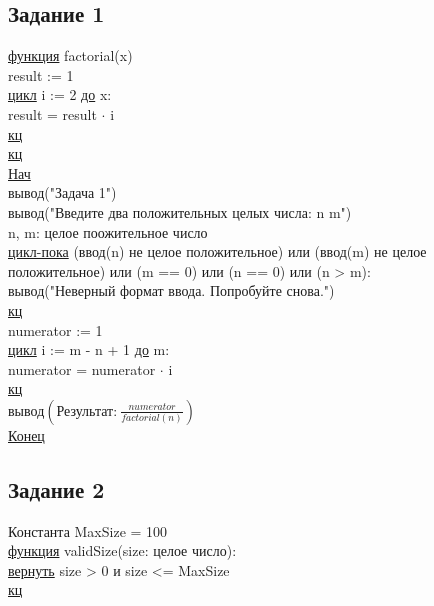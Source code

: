 \subsection*{Задание 1}

\noindent \underline{функция} factorial(x)\\
\null\null\qquad result := 1\\
\null\null\qquad \underline{цикл} i := 2 \underline{до} x:\\
\null\null\qquad \null\qquad result = result \(\cdot\) i\\
\null\null\qquad \underline{кц}\\
\underline{кц}\\

\noindent \underline{Нач}\\
\null\qquad вывод("Задача 1")\\
\null\qquad вывод("Введите два положительных целых числа: n m")\\

\noindent
\null\qquad n, m: целое поожительное число\\
\null\qquad \underline{цикл-пока} (ввод(n) не целое положительное) или (ввод(m) не целое положительное) или (m == 0) или (n == 0) или (n > m):\\
\null\qquad \qquad вывод("Неверный формат ввода. Попробуйте снова.")\\
\null\qquad \underline{кц}\\

\noindent
\null\qquad numerator := 1\\
\null\qquad \underline{цикл} i := m - n + 1 \underline{до} m:\\
\null\qquad \null\qquad numerator = numerator \(\cdot\) i\\
\null\qquad \underline{кц}\\
\null\qquad вывод\(\left(\text{Результат:}\ \displaystyle \frac{numerator}{factorial(n)}\right)\)\\
\underline{Конец}

\subsection*{Задание 2}

Константа MaxSize = 100\\

\noindent \underline{функция} validSize(size: целое число):\\
\null\qquad \underline{вернуть} size > 0 и size <= MaxSize\\
\underline{кц}\\


